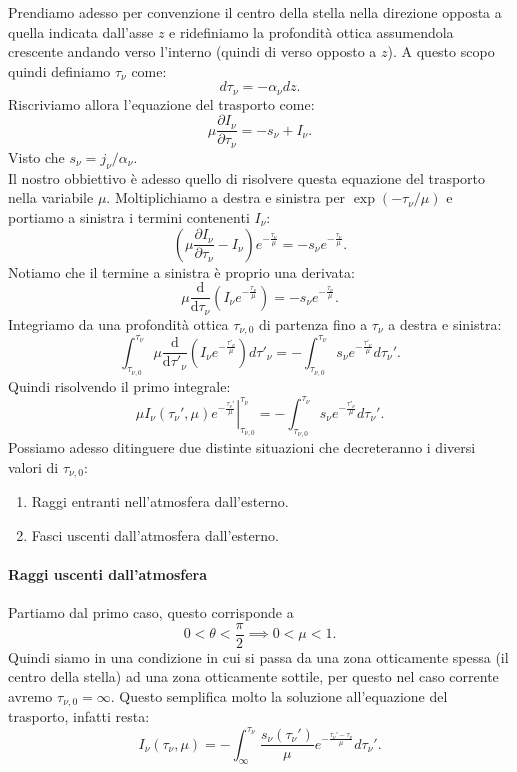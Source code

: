 Prendiamo adesso per convenzione il centro della stella nella direzione opposta a quella indicata dall'asse $z$ e ridefiniamo la profondità ottica assumendola crescente andando verso l'interno (quindi di verso opposto a $z$).
A questo scopo quindi definiamo $\tau _{\nu} $ come:
\[
	d\tau _{\nu} = -\alpha _{\nu} dz
.\] 
Riscriviamo allora l'equazione del trasporto come:
\[
	\mu \frac{\partial I_{\nu} }{\partial \tau _{\nu} } = -s_{\nu} + I_{\nu} 
.\] 
Visto che $s_{\nu} = j_{\nu} /\alpha _{\nu} $.\\
Il nostro obbiettivo è adesso quello di risolvere questa equazione del trasporto nella variabile $\mu $. Moltiplichiamo a destra e sinistra per $\exp\left( -\tau _{\nu} /\mu  \right) $ e portiamo a sinistra i termini contenenti $I_{\nu}$:
\[
	\left( \mu \frac{\partial I_{\nu} }{\partial \tau _{\nu} } - I_{\nu}  \right) e^{-\frac{\tau_{\nu}}{\mu }} = -s_{\nu} e^{-\frac{\tau _{\nu} }{\mu }}
.\] 
Notiamo che il termine a sinistra è proprio una derivata:
\[
	\mu \frac{\mbox{d} }{\mbox{d} \tau _{\nu} } \left( I_{\nu} e^{- \frac{\tau _{\nu} }{\mu } } \right) = -s_{\nu} e^{- \frac{\tau _{\nu} }{\mu }}
.\] 
Integriamo da una profondità ottica $\tau _{\nu, 0}$ di partenza fino a $\tau _{\nu} $ a destra e sinistra:
\[
	\int_{\tau _{\nu ,0}}^{\tau _{\nu} } \mu \frac{\mbox{d} }{\mbox{d} \tau' _{\nu} } \left( I_{\nu} e^{- \frac{\tau' _{\nu} }{\mu } } \right)d\tau '_{\nu} =
	-\int_{\tau _{\nu , 0}}^{\tau _{\nu} } s_{\nu} e^{-\frac{\tau' _{\nu} }{\mu }}d\tau _{\nu} ' 
.\] 
Quindi risolvendo il primo integrale:
\[
	\left.\mu I_{\nu} ( \tau _{\nu} ', \mu ) e^{-\frac{\tau _{\nu} '}{\mu }}\right|_{\tau _{\nu, 0}}^{\tau _{\nu} } =
	-\int_{\tau _{\nu , 0}}^{\tau _{\nu} } s_{\nu} e^{-\frac{\tau' _{\nu} }{\mu }}d\tau _{\nu} ' \label{eq:I-APP}
.\] 
Possiamo adesso ditinguere due distinte situazioni che decreteranno i diversi valori di $\tau_{\nu, 0}$: 
\begin{enumerate}
	\item Raggi entranti nell'atmosfera dall'esterno.
	\item Fasci uscenti dall'atmosfera dall'esterno.
\end{enumerate}
\paragraph{Raggi uscenti dall'atmosfera}
Partiamo dal primo caso, questo corrisponde a 
\[
	0< \theta <\frac{\pi}{2} \implies 0 < \mu < 1
.\] 
Quindi siamo in una condizione in cui si passa da una zona otticamente spessa (il centro della stella) ad una zona otticamente sottile, per questo nel caso corrente avremo $\tau _{\nu ,0}= \infty$. Questo semplifica molto la soluzione all'equazione del trasporto, infatti resta:
\[
	I_{\nu} ( \tau _{\nu} ,\mu ) = - \int_{\infty}^{\tau _{\nu} } \frac{s_{\nu} ( \tau _{\nu} ') }{\mu } e^{- \frac{\tau _{\nu} ' - \tau _{\nu} }{\mu }}d\tau _{\nu} '
.\] 
